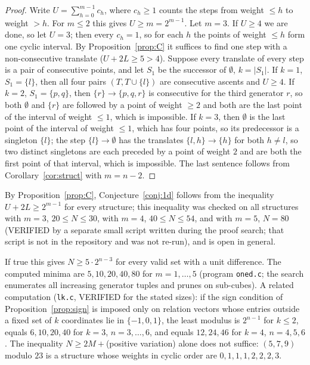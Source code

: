 \documentclass[11pt]{article}
\theoremstyle{definition}
\begin{document}
\begin{proof}
Write $U=\sum_{h=0}^{m-1}c_h$, where $c_h\ge1$ counts the steps from weight $\le h$ to weight $>h$. For $m\le2$ this gives $U\ge m=2^{m-1}$. Let $m=3$. If $U\ge4$ we are done, so let $U=3$; then every $c_h=1$, so for each $h$ the points of weight $\le h$ form one cyclic interval. By Proposition~\ref{prop:C} it suffices to find one step with a non-consecutive translate ($U+2L\ge5>4$). Suppose every translate of every step is a pair of consecutive points, and let $S_1$ be the successor of $\emptyset$, $k=|S_1|$. If $k=1$, $S_1=\{l\}$, then all four pairs $(T,T\cup\{l\})$ are consecutive ascents and $U\ge4$. If $k=2$, $S_1=\{p,q\}$, then $\{r\}\to\{p,q,r\}$ is consecutive for the third generator $r$, so both $\emptyset$ and $\{r\}$ are followed by a point of weight $\ge2$ and both are the last point of the interval of weight $\le1$, which is impossible. If $k=3$, then $\emptyset$ is the last point of the interval of weight $\le 1$, which has four points, so its predecessor is a singleton $\{l\}$; the step $\{l\}\to\emptyset$ has the translates $\{l,h\}\to\{h\}$ for both $h\ne l$, so two distinct singletons are each preceded by a point of weight $2$ and are both the first point of that interval, which is impossible. The last sentence follows from Corollary~\ref{cor:struct} with $m=n-2$.
\end{proof}
By Proposition~\ref{prop:C}, Conjecture~\ref{conj:1d} follows from the inequality $U+2L\ge 2^{m-1}$ for every structure; this inequality was checked on all structures with $m=3$, $20\le N\le30$, with $m=4$, $40\le N\le 54$, and with $m=5$, $N=80$ (VERIFIED by a separate small script written during the proof search; that script is not in the repository and was not re-run), and is open in general.

If true this gives $N\ge 5\cdot2^{n-3}$ for every valid set with a unit difference. The computed minima are $5,10,20,40,80$ for $m=1,\dots,5$ (program \texttt{oned.c}; the search enumerates all increasing generator tuples and prunes on sub-cubes). A related computation (\texttt{lk.c}, VERIFIED for the stated sizes): if the sign condition of Proposition~\ref{prop:sign} is imposed only on relation vectors whose entries outside a fixed set of $k$ coordinates lie in $\{-1,0,1\}$, the least modulus is $2^{n-1}$ for $k\le2$, equals $6,10,20,40$ for $k=3$, $n=3,\dots,6$, and equals $12,24,46$ for $k=4$, $n=4,5,6$. The inequality $N\ge2M+{}$(positive variation) alone does not suffice: $(5,7,9)$ modulo $23$ is a structure whose weights in cyclic order are $0,1,1,1,2,2,2,3$.
\end{document}
